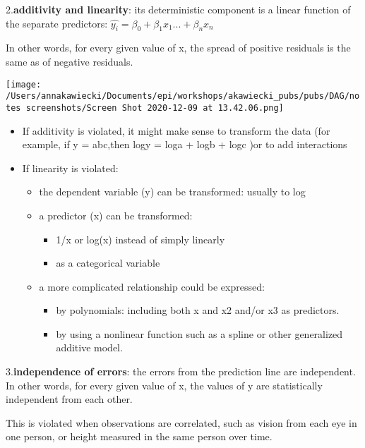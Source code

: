 \documentclass[
]{article}
\providecommand{\tightlist}{%
  \setlength{\itemsep}{0pt}\setlength{\parskip}{0pt}}
\begin{document}
2.\textbf{additivity and linearity}: its deterministic component is a
linear function of the separate predictors:
\(\hat{y_i}=\beta_0 +\beta_1x_1...+\beta_n x_n\)

In other words, for every given value of x, the spread of positive
residuals is the same as of negative residuals.

\texttt{[image: /Users/annakawiecki/Documents/epi/workshops/akawiecki\_pubs/pubs/DAG/notes screenshots/Screen Shot 2020-12-09 at 13.42.06.png]}

\begin{itemize}
\item
  If additivity is violated, it might make sense to transform the data
  (for example, if y = abc,then logy = loga + logb + logc )or to add
  interactions
\item
  If linearity is violated:

  \begin{itemize}
  \tightlist
  \item
    the dependent variable (y) can be transformed: usually to log
  \item
    a predictor (x) can be transformed:

    \begin{itemize}
    \tightlist
    \item
      1/x or log(x) instead of simply linearly
    \item
      as a categorical variable
    \end{itemize}
  \item
    a more complicated relationship could be expressed:

    \begin{itemize}
    \tightlist
    \item
      by polynomials: including both x and x2 and/or x3 as predictors.
    \item
      by using a nonlinear function such as a spline or other
      generalized additive model.
    \end{itemize}
  \end{itemize}
\end{itemize}

3.\textbf{independence of errors}: the errors from the prediction line
are independent. In other words, for every given value of x, the values
of y are statistically independent from each other.

This is violated when observations are correlated, such as vision from
each eye in one person, or height measured in the same person over time.
\end{document}
